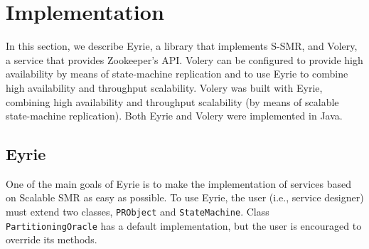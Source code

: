 \section{Implementation}
\label{sec:implementation}

In this section, we describe Eyrie, a library that implements S-SMR, and Volery, a service that provides Zookeeper's API.
Volery can be configured to provide high availability by means of state-machine replication and to use Eyrie to combine high availability and throughput scalability.
Volery was built with Eyrie, combining high availability and throughput scalability (by means of scalable state-machine replication).
Both Eyrie and Volery were implemented in Java.


\subsection{Eyrie}
\label{sec:libjssmr}

One of the main goals of Eyrie is to make the implementation of services based on Scalable SMR as easy as possible. 
To use Eyrie, the user (i.e., service designer) must extend two classes, \verb#PRObject# and \verb#StateMachine#. 
Class \verb#PartitioningOracle# has a default implementation, but the user is encouraged to override its methods. 



